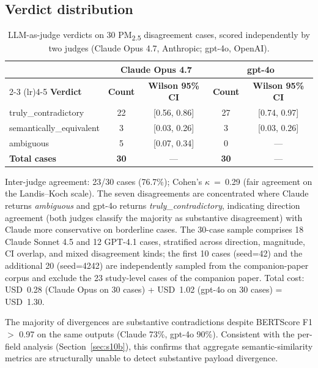 \documentclass[11pt]{article}
\begin{document}
\subsection{Verdict distribution}

\begin{table}[H]
\centering
\caption{LLM-as-judge verdicts on 30 PM\textsubscript{2.5} disagreement cases, scored independently by two judges (Claude Opus 4.7, Anthropic; gpt-4o, OpenAI).}
\label{tab:t3-verdicts}
\small
\begin{tabular}{@{}lcccc@{}}
\toprule
& \multicolumn{2}{c}{\textbf{Claude Opus 4.7}} & \multicolumn{2}{c}{\textbf{gpt-4o}} \\
\cmidrule(lr){2-3} \cmidrule(lr){4-5}
\textbf{Verdict} & \textbf{Count} & \textbf{Wilson 95\% CI} & \textbf{Count} & \textbf{Wilson 95\% CI} \\
\midrule
truly\_contradictory     & 22 & [0.56, 0.86] & 27 & [0.74, 0.97] \\
semantically\_equivalent &  3 & [0.03, 0.26] &  3 & [0.03, 0.26] \\
ambiguous                &  5 & [0.07, 0.34] &  0 & ---           \\
\midrule
\textbf{Total cases}     & \textbf{30} & --- & \textbf{30} & --- \\
\bottomrule
\end{tabular}
\par\smallskip\raggedright\footnotesize
Inter-judge agreement: 23/30 cases (76.7\%); Cohen's $\kappa$~=~0.29 (fair agreement on the Landis--Koch scale). The seven disagreements are concentrated where Claude returns \emph{ambiguous} and gpt-4o returns \emph{truly\_contradictory}, indicating direction agreement (both judges classify the majority as substantive disagreement) with Claude more conservative on borderline cases. The 30-case sample comprises 18 Claude Sonnet 4.5 and 12 GPT-4.1 cases, stratified across direction, magnitude, CI overlap, and mixed disagreement kinds; the first 10 cases (seed=42) and the additional 20 (seed=4242) are independently sampled from the companion-paper corpus and exclude the 23 study-level cases of the companion paper. Total cost: USD~0.28 (Claude Opus on 30 cases) + USD~1.02 (gpt-4o on 30 cases) = USD~1.30.
\par\smallskip\raggedright\footnotesize
The majority of divergences are substantive contradictions despite BERTScore F1 $>$ 0.97 on the same outputs (Claude 73\%, gpt-4o 90\%). Consistent with the per-field analysis (Section~\ref{sec:s10b}), this confirms that aggregate semantic-similarity metrics are structurally unable to detect substantive payload divergence.
\end{table}
\end{document}
